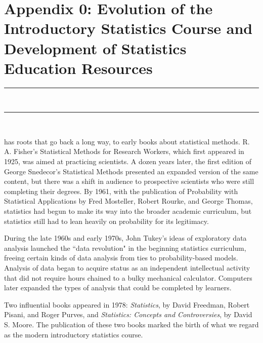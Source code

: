 \chapter{Appendix 0: Evolution of the Introductory Statistics Course and
Development of Statistics Education Resources}
\vspace{-.53in}
   \noindent\color{graylight}\rule[0cm]{3.25in}{0.03cm} \\
    \noindent\color{graylight}\rule[0.4cm]{3.25in}{0.03cm} \\
\color{black}








 has roots that go back a long way, to early books about statistical methods. R. A. Fisher's Statistical Methods for Research Workers, which first appeared in 1925, was aimed at practicing scientists. A dozen years later, the first edition of George Snedecor's Statistical Methods presented an expanded version of the same content, but there was a shift in audience to prospective scientists who were still completing their degrees.  By 1961, with the publication of Probability with Statistical Applications by Fred Mosteller, Robert Rourke, and George Thomas, statistics had begun to make its way into the broader academic curriculum, but statistics still had to lean heavily on probability for its legitimacy.

During the late 1960s and early 1970s, John Tukey's ideas of exploratory data analysis launched the ``data revolution" in the beginning statistics curriculum, freeing certain kinds of data analysis from ties to probability-based models.  Analysis of data began to acquire status as an independent intellectual activity that did not require hours chained to a bulky mechanical calculator. Computers later expanded the types of analysis that could be completed by learners.

Two influential books appeared in 1978: \emph{Statistics}, by David Freedman, Robert Pisani, and Roger Purves, and \emph{Statistics: Concepts and Controversies}, by David S. Moore. The publication of these two books marked the birth of what we regard as the modern introductory statistics course.

